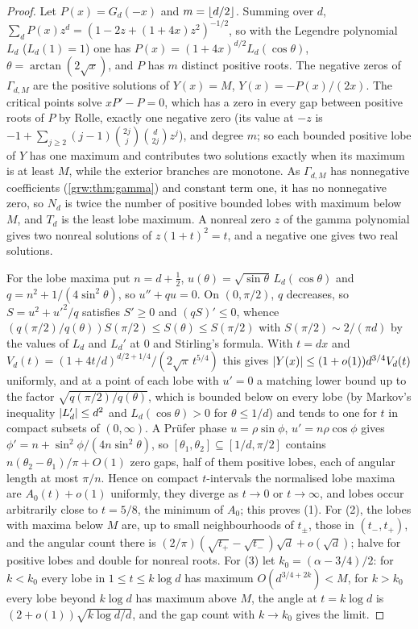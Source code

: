 \begin{proof}
Let $P(x)=G_d(-x)$ and $m=\lfloor d/2\rfloor$. Summing over $d$,
$\sum_dP(x)z^d=(1-2z+(1+4x)z^2)^{-1/2}$, so with the Legendre polynomial
$L_d$ ($L_d(1)=1$) one has $P(x)=(1+4x)^{d/2}L_d(\cos\theta)$,
$\theta=\arctan(2\sqrt x)$, and $P$ has $m$ distinct positive roots. The
negative zeros of $\Gamma_{d,M}$ are the positive solutions of $Y(x)=M$,
$Y(x)=-P(x)/(2x)$. The critical points solve $xP'-P=0$, which has a zero in
every gap between positive roots of $P$ by Rolle, exactly one negative
zero (its value at $-z$ is $-1+\sum_{j\ge2}(j-1)\binom{2j}j\binom d{2j}z^j$),
and degree $m$; so each bounded positive lobe of $Y$ has one maximum and
contributes two solutions exactly when its maximum is at least $M$, while the
exterior branches are monotone. As $\Gamma_{d,M}$ has nonnegative
coefficients (\cref{grw:thm:gamma}) and constant term one, it has no
nonnegative zero, so $N_d$ is
twice the number of positive bounded lobes with maximum below $M$, and $T_d$
is the least lobe maximum. A nonreal zero $z$ of the gamma polynomial gives
two nonreal solutions of $z(1+t)^2=t$, and a negative one gives two real
solutions.

For the lobe maxima put $n=d+\frac12$, $u(\theta)=\sqrt{\sin\theta}\,
L_d(\cos\theta)$ and $q=n^2+1/(4\sin^2\theta)$, so $u''+qu=0$. On
$(0,\pi/2)$, $q$ decreases, so $S=u^2+u'^2/q$ satisfies $S'\ge0$ and
$(qS)'\le0$, whence $(q(\pi/2)/q(\theta))S(\pi/2)\le S(\theta)\le S(\pi/2)$
with $S(\pi/2)\sim2/(\pi d)$ by the values of $L_d$ and $L_d'$ at $0$ and
Stirling's formula. With $t=dx$ and
$V_d(t)=(1+4t/d)^{d/2+1/4}/(2\sqrt\pi\,t^{5/4})$ this gives
$\lvert Y(x)\rvert\le(1+o(1))d^{3/4}V_d(t)$ uniformly, and at a point of each lobe
with $u'=0$ a matching lower bound up to the factor
$\sqrt{q(\pi/2)/q(\theta)}$, which is bounded below on every lobe (by
Markov's inequality $\lvert L_d'\rvert\le d^2$ and $L_d(\cos\theta)>0$ for
$\theta\le1/d$) and tends to one for $t$ in compact subsets of
$(0,\infty)$. A Pr\"ufer phase $u=\rho\sin\phi$, $u'=n\rho\cos\phi$ gives
$\phi'=n+\sin^2\phi/(4n\sin^2\theta)$, so $[\theta_1,\theta_2]\subseteq
[1/d,\pi/2]$ contains $n(\theta_2-\theta_1)/\pi+O(1)$ zero gaps, half of them
positive lobes, each of angular length at most $\pi/n$. Hence on compact
$t$-intervals the normalised lobe maxima are $A_0(t)+o(1)$ uniformly, they
diverge as $t\to0$ or $t\to\infty$, and lobes occur arbitrarily close to
$t=5/8$, the minimum of $A_0$; this proves (1). For (2), the lobes with maxima
below $M$ are, up to small neighbourhoods of $t_\pm$, those in $(t_-,t_+)$,
and the angular count there is $(2/\pi)(\sqrt{t_+}-\sqrt{t_-})\sqrt d+
o(\sqrt d)$; halve for positive lobes and double for nonreal roots. For (3)
let $k_0=(\alpha-3/4)/2$: for $k<k_0$ every lobe in $1\le t\le k\log d$ has
maximum $O(d^{3/4+2k})<M$, for $k>k_0$ every lobe beyond $k\log d$ has maximum
above $M$, the angle at $t=k\log d$ is $(2+o(1))\sqrt{k\log d/d}$, and the
gap count with $k\to k_0$ gives the limit.
\end{proof}

